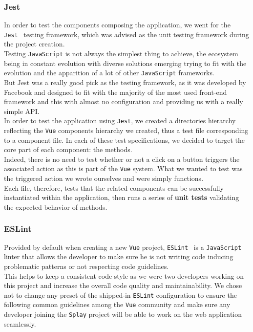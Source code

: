 \documentclass{eplmastersthesis}
\begin{document}
        \subsubsection{Jest}

          In order to test the components composing the application, we
          went for the \texttt{Jest}~\cite{jest} testing framework, which was advised
          as the unit testing framework during the project creation.\\

          Testing \texttt{JavaScript} is not always the simplest thing to achieve, the
          ecosystem being in constant evolution with diverse solutions emerging
          trying to fit with the evolution and the apparition of a lot of
          other \texttt{JavaScript} frameworks.\\
          But Jest was a really good pick as the testing framework, as it was
          developed by Facebook and designed to fit with the majority of the
          most used front-end framework and this with almost no configuration and
          providing us with a really simple API.\\

          In order to test the application using \texttt{Jest}, we created a directories
          hierarchy reflecting the \texttt{Vue} components hierarchy we created, thus
          a test file corresponding to a component file. In each of these
          test specifications, we decided to target the core part of each
          component: the methods.\\
          Indeed, there is no need to test whether or not a click on a button
          triggers the associated action as this is part of the \texttt{Vue} system. What
          we wanted to test was the triggered action we wrote ourselves and
          were simply functions.\\
          Each file, therefore, tests that the related components can be
          successfully instantiated within the application, then runs a series
          of \textbf{unit tests} validating the expected behavior of methods.

        \subsubsection{ESLint}

          Provided by default when creating a new \texttt{Vue} project, \texttt{ESLint}~\cite{eslint}
          is a \texttt{JavaScript} linter that allows the developer to
          make sure he is not writing code inducing problematic patterns or not
          respecting code guidelines.\\
          This helps to keep a consistent code style as we were two developers working
          on this project and increase the overall code quality and
          maintainability. We chose not to change any preset of the shipped-in
          \texttt{ESLint} configuration to ensure the following common guidelines among the \texttt{Vue}
          community and make sure any developer joining the \texttt{Splay} project will
          be able to work on the web application seamlessly.
\end{document}
